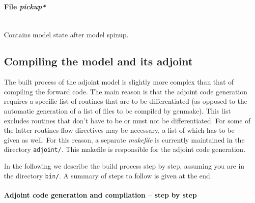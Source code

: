 \paragraph{File {\it pickup*}} ~ \\
%
Contains model state after model spinup.

\subsection{Compiling the model and its adjoint}
\label{www:tutorials}

The built process of the adjoint model is slightly more
complex than that of compiling the forward code.
The main reason is that the adjoint code generation requires
a specific list of routines that are to be differentiated
(as opposed to the automatic generation of a list of
files to be compiled by genmake).
This list excludes routines that don't have to be or must not be
differentiated. For some of the latter routines flow directives
may be necessary, a list of which has to be given as well.
For this reason, a separate {\it makefile} is currently 
maintained in the directory {\tt adjoint/}. This
makefile is responsible for the adjoint code generation.

In the following we describe the build process step by step,
assuming you are in the directory {\tt bin/}.
A summary of steps to follow is given at the end.

\paragraph{Adjoint code generation and compilation -- step by step}

